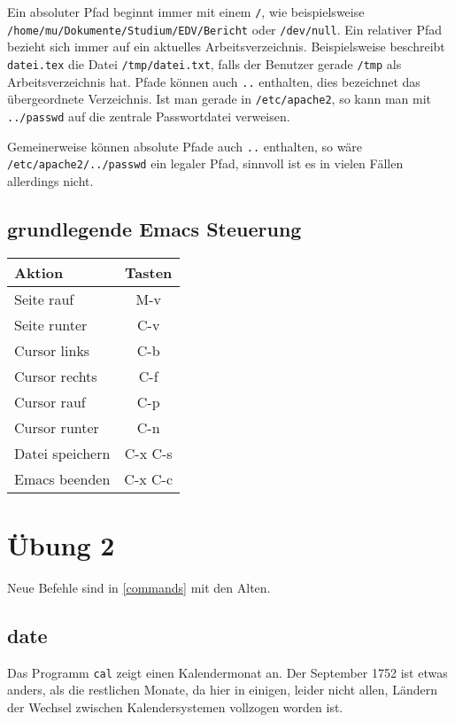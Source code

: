\documentclass[12pt]{article}
\begin{document}
Ein absoluter Pfad beginnt immer mit einem \texttt{/}, wie beispielsweise \\ \texttt{/home/mu/Dokumente/Studium/EDV/Bericht} oder \texttt{/dev/null}. Ein relativer Pfad bezieht sich immer auf ein aktuelles Arbeitsverzeichnis. Beispielsweise beschreibt \texttt{datei.tex} die Datei \texttt{/tmp/datei.txt}, falls der Benutzer gerade \texttt{/tmp} als Arbeitsverzeichnis hat. Pfade können auch \texttt{..} enthalten, dies bezeichnet das übergeordnete Verzeichnis. Ist man gerade in \texttt{/etc/apache2}, so kann man mit \texttt{../passwd} auf die zentrale Passwortdatei verweisen.

Gemeinerweise können absolute Pfade auch \texttt{..} enthalten, so wäre \\
\texttt{/etc/apache2/../passwd} ein legaler Pfad, sinnvoll ist es in vielen Fällen allerdings nicht.

\subsection{grundlegende Emacs Steuerung}

\begin{tabular}{lc}
Aktion & Tasten \\
\hline
Seite rauf & M-v \\
Seite runter & C-v \\
Cursor links & C-b \\
Cursor rechts & C-f \\
Cursor rauf & C-p \\
Cursor runter & C-n \\
Datei speichern & C-x C-s \\
Emacs beenden & C-x C-c \\
\end{tabular}

\section{Übung 2}

Neue Befehle sind in \ref{commands} mit den Alten.

\subsection{date}

Das Programm \texttt{cal} zeigt einen Kalendermonat an. Der September 1752 ist etwas anders, als die restlichen Monate, da hier in einigen, leider nicht allen, Ländern der Wechsel zwischen Kalendersystemen vollzogen worden ist.
\end{document}
